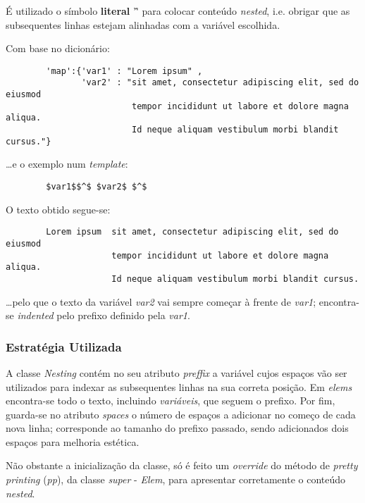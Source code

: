 \documentclass[../relatorio.tex]{subfiles}
\begin{document}
    É utilizado o símbolo \textbf{literal} '\^' para 
    colocar conteúdo \textit{nested}, i.e. obrigar que
    as subsequentes linhas estejam alinhadas com a variável 
    escolhida.

    Com base no dicionário:

    \begin{verbatim}
        'map':{'var1' : "Lorem ipsum" , 
               'var2' : "sit amet, consectetur adipiscing elit, sed do eiusmod
                         tempor incididunt ut labore et dolore magna aliqua. 
                         Id neque aliquam vestibulum morbi blandit cursus."}
    \end{verbatim}

    \dots e o exemplo num \textit{template}:

    \begin{verbatim}
        $var1$$^$ $var2$ $^$
    \end{verbatim}
                           
    O texto obtido segue-se:
    \begin{verbatim}
        Lorem ipsum  sit amet, consectetur adipiscing elit, sed do eiusmod
                     tempor incididunt ut labore et dolore magna aliqua. 
                     Id neque aliquam vestibulum morbi blandit cursus.
    \end{verbatim}

    \dots pelo que o texto da variável \textit{var2} vai sempre começar 
    à frente de \textit{var1}; encontra-se \textit{indented} pelo prefixo 
    definido pela \textit{var1}.
    
    \subsubsection{Estratégia Utilizada}
    
    A classe \textit{Nesting} contém no seu atributo \textit{preffix} a 
    variável cujos espaços vão ser utilizados para indexar as subsequentes
    linhas na sua correta posição.
    Em \textit{elems} encontra-se todo o texto, incluindo \textit{variáveis},
    que seguem o prefixo.
    Por fim, guarda-se no atributo \textit{spaces} o número de espaços a adicionar
    no começo de cada nova linha; corresponde ao tamanho do prefixo passado,
    sendo adicionados dois espaços para melhoria estética.
    
    Não obstante a inicialização da classe, só é feito um \textit{override}
    do método de \textit{pretty printing} (\textit{pp}), da classe 
    \textit{super} - \textit{Elem}, para apresentar corretamente 
    o conteúdo \textit{nested}.
    
\end{document}
